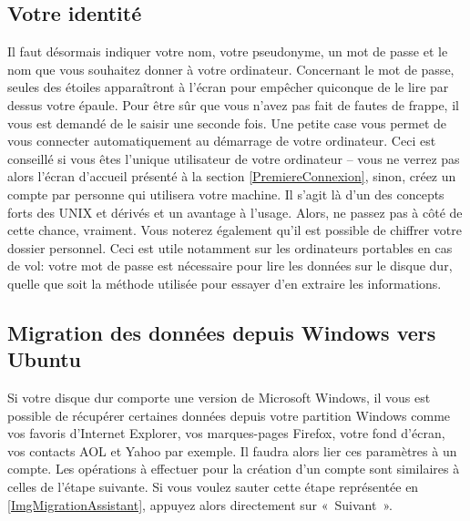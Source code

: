 \subsection{Votre identité}
\label{InstallIdentite}
Il faut désormais indiquer votre nom, votre pseudonyme, un mot de passe et le nom que vous souhaitez donner à votre ordinateur. Concernant le mot de passe, seules des étoiles apparaîtront à l'écran pour empêcher quiconque de le lire par dessus votre épaule. Pour être sûr que vous n'avez pas fait de fautes de frappe, il vous est demandé de le saisir une seconde fois. Une petite case vous permet de vous connecter automatiquement au démarrage de votre ordinateur. Ceci est conseillé si vous êtes l'unique utilisateur de votre ordinateur -- vous ne verrez pas alors l'écran d'accueil présenté à la section \ref{PremiereConnexion}, sinon, créez un compte par personne qui utilisera votre machine. Il s'agit là d'un des concepts forts des UNIX et dérivés et un avantage à l'usage. Alors, ne passez pas à côté de cette chance, vraiment. Vous noterez également qu'il est possible de chiffrer votre dossier personnel. Ceci est utile notamment sur les ordinateurs portables en cas de vol: votre mot de passe est nécessaire pour lire les données sur le disque dur, quelle que soit la méthode utilisée pour essayer d'en extraire les informations.\par
{}
\subsection{Migration des données depuis Windows vers Ubuntu}
Si votre disque dur comporte une version de Microsoft Windows, il vous est possible de récupérer certaines données depuis votre partition Windows comme vos favoris d'Internet Explorer, vos marques-pages Firefox, votre fond d'écran, vos contacts AOL et Yahoo par exemple. Il faudra alors lier ces paramètres à un compte. Les opérations à effectuer pour la création d'un compte sont similaires à celles de l'étape suivante. Si vous voulez sauter cette étape représentée en \ref{ImgMigrationAssistant}, appuyez alors directement sur «~Suivant~».\par
{}
